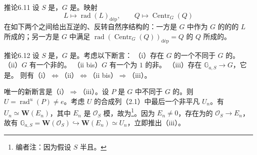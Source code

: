 \begin{SGAresult}{推论}{6.11}
设 $S$ 是，$G$ 是。映射
\[
 L\longmapsto\operatorname{rad}(L)_{\mathrm{d\text{é}p}},\qquad
 Q\longmapsto\operatorname{Centr}_G(Q)
\]
在如下两个之间给出互逆的、反转自然序结构的：一方是 $G$ 中作为 $G$ 的的的 $L$ 所成的；另一方是 $G$ 中满足 $\operatorname{rad}(\operatorname{Centr}_G(Q))_{\mathrm{d\text{é}p}}=Q$ 的 $Q$ 所成的。
\end{SGAresult}
\begin{SGAresult}{推论}{6.12}
设 $S$ 是，$G$ 是。考虑以下断言：
（i）存在 $G$ 的一个不同于 $G$ 的。
（ii）$G$ 有一个非的。
（ii bis）$G$ 有一个为 $1$ 的非。
（iii）存在 $\mathbb G_{a,S}\to G$，它是。
则有（i）$\Leftrightarrow$（ii）$\Leftrightarrow$（ii bis）$\Rightarrow$（iii）。
\end{SGAresult}
唯一的新断言是（i）$\Rightarrow$（iii）。设 $P$ 是 $G$ 中不同于 $G$ 的。则 $U=\operatorname{rad}^{u}(P)\neq e$。考虑 $U$ 的合成列（2.1）中最后一个非平凡 $U_n$。有 $U_n\simeq\mathbf W(E_n)$，其中 $E_n$ 是 $\mathscr O_S$ 模，故为\footnote{编者注：因为假设 $S$ 半且。}。因为 $E_n\neq0$，存在为的 $\mathscr O_S\to E_n$，故有
$\mathbb G_{a,S}=\mathbf W(\mathscr O_S)\hookrightarrow\mathbf W(E_n)\simeq U_n$，立即推出（iii）。

